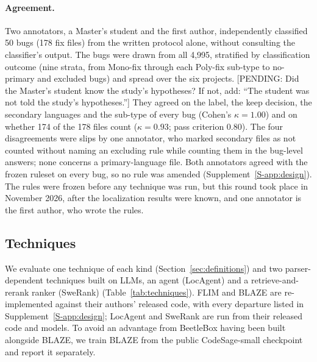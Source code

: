 \documentclass[a4paper,fleqn]{cas-dc}
\newcommand{\pending}[1]{\textcolor{red!70!black}{[PENDING: #1]}}
\begin{document}
\paragraph{Agreement.} Two annotators, a Master's student and the first
author, independently classified 50 bugs (178 fix files) from the written
protocol alone, without consulting the classifier's output. The bugs were
drawn from all 4{,}995, stratified by classification outcome (nine strata,
from Mono-fix through each Poly-fix sub-type to no-primary and excluded bugs)
and spread over the six projects. \pending{Did the Master's student know the study's
hypotheses? If not, add: ``The student was not told the study's
hypotheses.''} They agreed on the label, the keep decision,
the secondary languages and the sub-type of every bug (Cohen's $\kappa=1.00$)
and on whether 174 of the 178 files count ($\kappa=0.93$; pass criterion
0.80). The four disagreements were slips by one annotator, who marked
secondary files as not counted without naming an excluding rule while
counting them in the bug-level answers; none concerns a primary-language file.
Both annotators agreed with the frozen ruleset on every bug, so no rule was
amended (Supplement~\ref{S-app:design}). The rules were frozen before any
technique was run, but this round took place in November 2026, after the
localization results were known, and one annotator is the first author, who
wrote the rules.

\subsection{Techniques}\label{sec:techniques}

We evaluate one technique of each kind (Section~\ref{sec:definitions}) and two
parser-dependent techniques built on LLMs, an agent (LocAgent) and a
retrieve-and-rerank ranker (SweRank) (Table~\ref{tab:techniques}). FLIM and
BLAZE are re-implemented against their authors' released code, with every
departure listed in Supplement~\ref{S-app:design}; LocAgent and SweRank are run
from their released code and models. To avoid an advantage from BeetleBox
having been built alongside BLAZE, we train BLAZE from the public
CodeSage-small checkpoint and report it separately.
\end{document}
